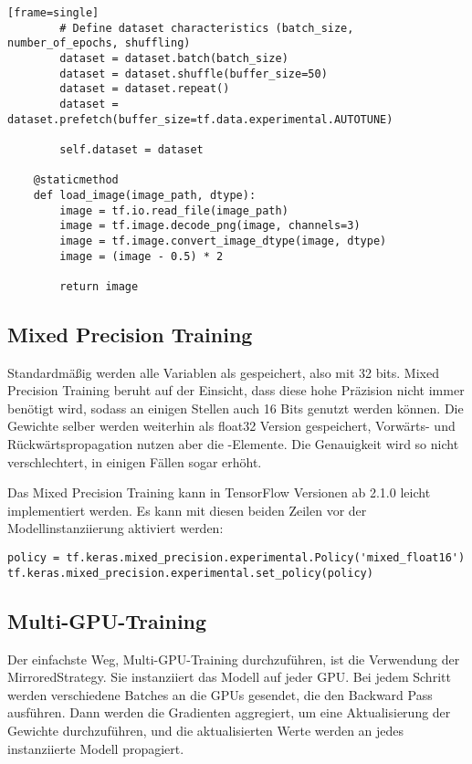 \begin{verbatim}[frame=single]
        # Define dataset characteristics (batch_size, number_of_epochs, shuffling)
        dataset = dataset.batch(batch_size)
        dataset = dataset.shuffle(buffer_size=50)
        dataset = dataset.repeat()
        dataset = dataset.prefetch(buffer_size=tf.data.experimental.AUTOTUNE)

        self.dataset = dataset

    @staticmethod
    def load_image(image_path, dtype):
        image = tf.io.read_file(image_path)
        image = tf.image.decode_png(image, channels=3)
        image = tf.image.convert_image_dtype(image, dtype)
        image = (image - 0.5) * 2
        
        return image
\end{verbatim}


\subsection{Mixed Precision Training}

Standardmäßig werden alle Variablen als  gespeichert, also mit 32 bits. Mixed Precision Training beruht auf der Einsicht, dass diese hohe Präzision nicht immer benötigt wird, sodass an einigen Stellen auch 16 Bits genutzt werden können. Die Gewichte selber werden weiterhin als float32 Version gespeichert, Vorwärts- und Rückwärtspropagation nutzen aber die -Elemente. Die Genauigkeit wird so nicht verschlechtert, in einigen Fällen sogar erhöht.

Das Mixed Precision Training kann in TensorFlow Versionen ab 2.1.0 leicht implementiert werden. 
Es kann mit diesen beiden Zeilen vor der Modellinstanziierung aktiviert werden:

\begin{verbatim}
policy = tf.keras.mixed_precision.experimental.Policy('mixed_float16')
tf.keras.mixed_precision.experimental.set_policy(policy) 
\end{verbatim}

\subsection{Multi-GPU-Training}
Der einfachste Weg, Multi-GPU-Training durchzuführen, ist die Verwendung der MirroredStrategy. 
Sie instanziiert das Modell auf jeder GPU. Bei jedem Schritt werden verschiedene Batches an die GPUs gesendet, die den Backward Pass ausführen.
 Dann werden die Gradienten aggregiert, um eine Aktualisierung der Gewichte durchzuführen, und die aktualisierten Werte werden 
 an jedes instanziierte Modell propagiert.

